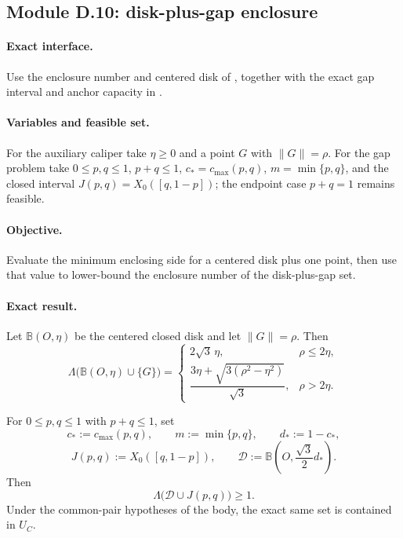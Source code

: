 \subsection{Module D.10: disk-plus-gap enclosure}
\label{subsec:app-solved-nonzero-gap-terminals}

\paragraph{Exact interface.}
Use the enclosure number and centered disk of
, together with the exact gap interval and
anchor capacity in .

\paragraph{Variables and feasible set.}
For the auxiliary caliper take $\eta\ge0$ and a point $G$ with
$\lVert G\rVert=\rho$.  For the gap problem take $0\le p,q\le1$,
$p+q\le1$, $c_*=c_{\max}(p,q)$, $m=\min\{p,q\}$, and the closed interval
$J(p,q)=X_0([q,1-p])$; the endpoint case $p+q=1$ remains feasible.

\paragraph{Objective.}
Evaluate the minimum enclosing side for a centered disk plus one point, then
use that value to lower-bound the enclosure number of the disk-plus-gap set.

\paragraph{Exact result.}

\begin{lemma}
\label{lem:app-disk-point-formula}
Let $\mathbb B(O,\eta)$ be the centered closed disk and let $\lVert G\rVert=\rho$.
Then
\[
 \Lambda\bigl(\mathbb B(O,\eta)\cup\{G\}\bigr)=
 \begin{cases}
  2\sqrt3\,\eta,&\rho\le2\eta,\\[1mm]
  \dfrac{3\eta+\sqrt{3(\rho^2-\eta^2)}}{\sqrt3},&\rho>2\eta.
 \end{cases}
\]
\end{lemma}

\begin{lemma}
\label{lem:app-complementary-gap}
For $0\le p,q\le1$ with $p+q\le1$, set
\[
 c_*:=c_{\max}(p,q),\qquad m:=\min\{p,q\},\qquad d_*:=1-c_*,
\]
\[
 J(p,q):=X_0([q,1-p]),
 \qquad \mathcal D:=\mathbb B\!\left(O,\frac{\sqrt3}{2}d_*\right).
\]
Then
\[
 \Lambda\bigl(\mathcal D\cup J(p,q)\bigr)\ge1.
\]
Under the common-pair hypotheses of the body, the exact same set is contained
in $U_C$.
\end{lemma}

